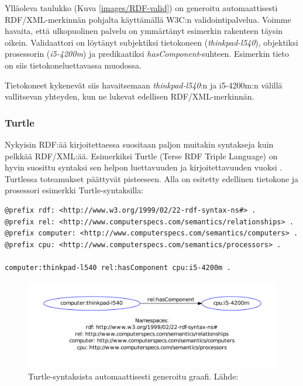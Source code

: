 \documentclass[finnish, 12pt, a4paper, elec, utf8, pdfa, online]{aaltothesis}
\begin{document}
Ylläoleva taulukko (Kuva \ref{images/RDF-valid}) on generoitu automaattisesti RDF/XML-merkinnän pohjalta käyttämällä W3C:n validointipalvelua. Voimme havaita, että ulkopuolinen palvelu on ymmärtänyt esimerkin rakenteen täysin oikein. Validaattori on löytänyt subjektiksi tietokoneen (\textit{thinkpad-l540}), objektiksi prosessorin (\textit{i5-4200m}) ja predikaatiksi \textit{hasComponent}-suhteen. Esimerkin tieto on siis tietokoneluettavassa muodossa.

Tietokoneet kykenevät siis havaitsemaan \textit{thinkpad-l540}:n ja i5-4200m:n välillä vallitsevan yhteyden, kun ne lukevat edellisen RDF/XML-merkinnän.


\subsubsection{Turtle}
Nykyisin RDF:ää kirjoitettaessa suositaan paljon muitakin syntakseja kuin pelkkää RDF/XML:ää. Esimerkiksi Turtle (Terse RDF Triple Language) on hyvin suosittu syntaksi sen helpon luettavuuden ja kirjoitettavuuden vuoksi \cite{cambridge2}. Turtlessa toteamukset päättyvät pisteeseen. Alla on esitetty edellinen tietokone ja prosessori esimerkki Turtle-syntaksilla:

\vskip 0.75cm
\begin{lstlisting}[style=codeblock,caption={Turtle syntaksiesimerkki.},captionpos=b,label={turtle_esim}]
@prefix rdf: <http://www.w3.org/1999/02/22-rdf-syntax-ns#> .
@prefix rel: <http://www.computerspecs.com/semantics/relationships> .
@prefix computer: <http://www.computerspecs.com/semantics/computers> .
@prefix cpu: <http://www.computerspecs.com/semantics/processors> .

computer:thinkpad-l540 rel:hasComponent cpu:i5-4200m .

\end{lstlisting}
\vskip 0.75cm

\begin{figure}[htb]
\centering
\includegraphics[width=15cm]{images/RDF-triplet2.pdf}
\vspace{-3pc}
\caption{Turtle-syntaksista automaattisesti generoitu graafi. Lähde: \cite{SeCo_RDF_validator} \label{images/RDF-triplet2}}
\end{figure}
\end{document}
